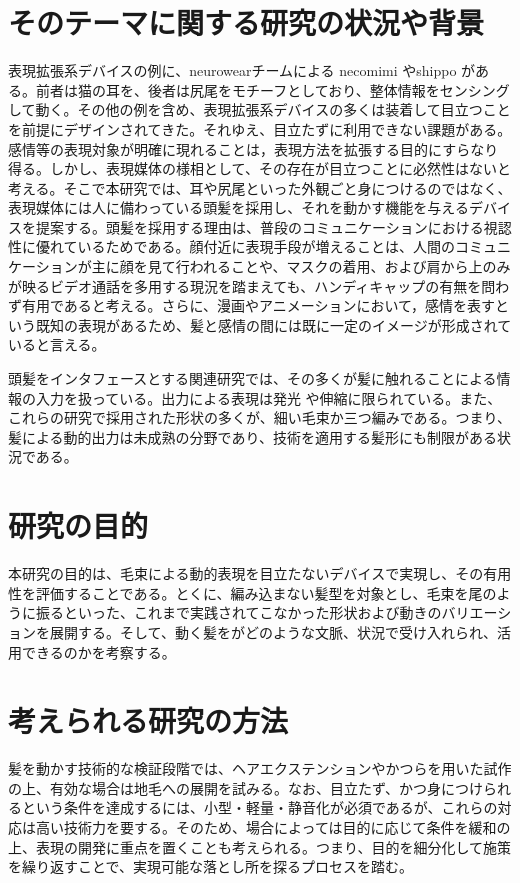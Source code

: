\documentclass[a4paper]{jsarticle}
\begin{document}
\section{そのテーマに関する研究の状況や背景}
表現拡張系デバイスの例に、neurowearチームによる necomimi \cite{necomimi}やshippo \cite{shippo}がある。前者は猫の耳を、後者は尻尾をモチーフとしており、整体情報をセンシングして動く。その他の例を含め、表現拡張系デバイスの多くは装着して目立つことを前提にデザインされてきた。それゆえ、目立たずに利用できない課題がある。感情等の表現対象が明確に現れることは，表現方法を拡張する目的にすらなり得る。しかし、表現媒体の様相として、その存在が目立つことに必然性はないと考える。そこで本研究では、耳や尻尾といった外観ごと身につけるのではなく、表現媒体には人に備わっている頭髪を採用し、それを動かす機能を与えるデバイスを提案する。頭髪を採用する理由は、普段のコミュニケーションにおける視認性に優れているためである。顔付近に表現手段が増えることは、人間のコミュニケーションが主に顔を見て行われることや、マスクの着用、および肩から上のみが映るビデオ通話を多用する現況を踏まえても、ハンディキャップの有無を問わず有用であると考える。さらに、漫画やアニメーションにおいて，感情を表すという既知の表現があるため、髪と感情の間には既に一定のイメージが形成されていると言える。

頭髪をインタフェースとする関連研究では、その多くが髪に触れることによる情報の入力を扱っている\cite{smartWig}\cite{Hairware}\cite{HairIO}。出力による表現は発光\cite{LH} \cite{VariWig}や伸縮\cite{HairIO}に限られている。また、これらの研究で採用された形状の多くが、細い毛束か三つ編みである。つまり、髪による動的出力は未成熟の分野であり、技術を適用する髪形にも制限がある状況である。

\section{研究の目的} 
本研究の目的は、毛束による動的表現を目立たないデバイスで実現し、その有用性を評価することである。とくに、編み込まない髪型を対象とし、毛束を尾のように振るといった、これまで実践されてこなかった形状および動きのバリエーションを展開する。そして、動く髪をがどのような文脈、状況で受け入れられ、活用できるのかを考察する。

\section{考えられる研究の方法} 
髪を動かす技術的な検証段階では、ヘアエクステンションやかつらを用いた試作の上、有効な場合は地毛への展開を試みる。なお、目立たず、かつ身につけられるという条件を達成するには、小型・軽量・静音化が必須であるが、これらの対応は高い技術力を要する。そのため、場合によっては目的に応じて条件を緩和の上、表現の開発に重点を置くことも考えられる。つまり、目的を細分化して施策を繰り返すことで、実現可能な落とし所を探るプロセスを踏む。
\end{document}
